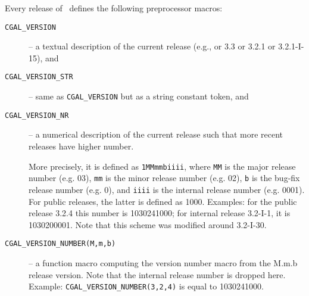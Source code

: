 Every release of \cgal\ defines the following preprocessor macros:
\begin{description}
\item[\texttt{CGAL\_VERSION}]
     -- a textual description of the current release
        (e.g., or 3.3 or 3.2.1 or 3.2.1-I-15), and 
\item[\texttt{CGAL\_VERSION\_STR}]
     -- same as \texttt{CGAL\_VERSION} but as a string constant token, and
\item[\texttt{CGAL\_VERSION\_NR}]
     -- a numerical description of the current release such that
        more recent releases have higher number.

     More precisely, it is defined as \texttt{1MMmmbiiii},
     where \texttt{MM} is the major release number (e.g. 03),
     \texttt{mm} is the minor release number (e.g. 02),
     \texttt{b} is the bug-fix release number (e.g. 0), and
     \texttt{iiii} is the internal release number (e.g. 0001). For
     public releases, the latter is defined as 1000.
     Examples: for the public release 3.2.4 this number is 
     1030241000; for internal release 3.2-I-1, it is 1030200001.
     Note that this scheme was modified around 3.2-I-30.
\item[\texttt{CGAL\_VERSION\_NUMBER(M,m,b)}]
     -- a function macro computing the version number macro
     from the M.m.b release version.  Note that the internal release
     number is dropped here.  Example: \texttt{CGAL\_VERSION\_NUMBER(3,2,4)}
     is equal to 1030241000.
\end{description}
 

